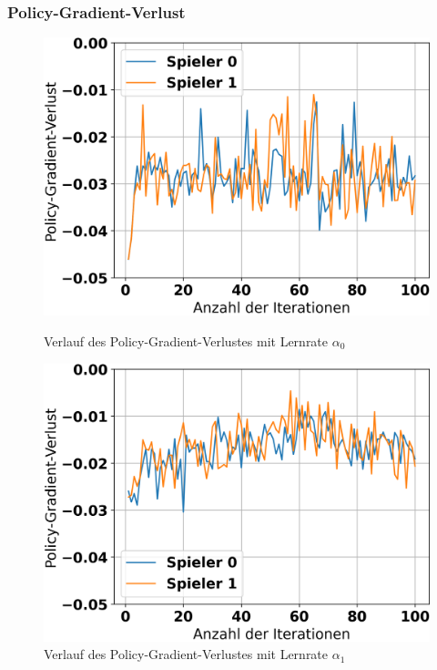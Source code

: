 \subsubsection{Policy-Gradient-Verlust}

\begin{figure}[H]
	\begin{minipage}[c]{0.32\linewidth}
		\includegraphics[width=\linewidth]{Bilder/ensemble-training/a_0_001/graph_policy_gradient_losses.png}
		\caption{Verlauf des Policy-Gradient-Verlustes mit Lernrate $\alpha_0$}
	\end{minipage}
	\hfill
	\begin{minipage}[c]{0.32\linewidth}
		\includegraphics[width=\linewidth]{Bilder/ensemble-training/b_0_0003/graph_policy_gradient_losses.png}
		\caption{Verlauf des Policy-Gradient-Verlustes mit Lernrate $\alpha_1$}

\end{minipage}
\end{figure}
